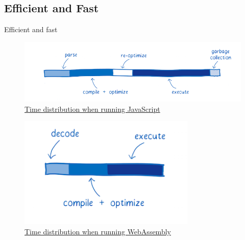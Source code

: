 \documentclass{beamer}
\begin{document}
\subsection{Efficient and Fast}

\begin{frame}{Efficient and fast}
    \begin{figure}
        \includegraphics[scale=0.3]{./images/javascriptgraph.png}
        \caption{\href{https://www.smashingmagazine.com/2017/05/abridged-cartoon-introduction-webassembly/}{Time distribution when running JavaScript}}
    \end{figure}
    \begin{figure}
        \includegraphics[scale=0.4]{./images/wasmgraph.png}
        \caption{\href{https://www.smashingmagazine.com/2017/05/abridged-cartoon-introduction-webassembly/}{Time distribution when running WebAssembly}}
    \end{figure}
\end{frame}
\end{document}
